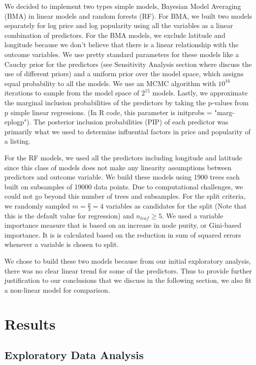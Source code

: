 \documentclass{article}
\begin{document}
We decided to implement two types simple models, Bayesian Model Averaging (BMA) in linear models and random forests (RF). For BMA, we built two models separately for log price and log popularity using all the variables as a linear combination of predictors. For the BMA models, we exclude latitude and longitude because we don't believe that there is a linear relationship with the outcome variables. We use pretty standard parameters for these models like a Cauchy prior for the predictors (see Sensitivity Analysis section where discuss the use of different priors) and a uniform prior over the model space, which assigns equal probability to all the models. We use an MCMC algorithm with $10^{16}$ iterations to sample from the model space of $2^{15}$ models. Lastly, we approximate the marginal inclusion probabilities of the predictors by taking the p-values from p simple linear regressions. (In R code, this parameter is initprobs = "marg-eplogp"). The posterior inclusion probabilities (PIP) of each predictor was primarily what we used to determine influential factors in price and popularity of a listing. 

For the RF models, we used all the predictors including longitude and latitude since this class of models does not make any linearity assumptions between predictors and outcome variable. We build these models using 1900 trees each built on subsamples of 19000 data points. Due to computational challenges, we could not go beyond this number of trees and subsamples. For the split criteria, we randomly sampled $m = \frac{p}{3} = 4$ variables as candidates for the split (Note that this is the default value for regression) and $n_{leaf} \geq 5$. We used a variable importance measure that is based on an increase in node purity, or Gini-based importance. It is is calculated based on the reduction in sum of squared errors whenever a variable is chosen to split.

We chose to build these two models because from our initial exploratory analysis, there was no clear linear trend for some of the predictors. Thus to provide further justification to our conclusions that we discuss in the following section, we also fit a non-linear model for comparison. 

\section{Results}

\subsection{Exploratory Data Analysis} 
\end{document}
